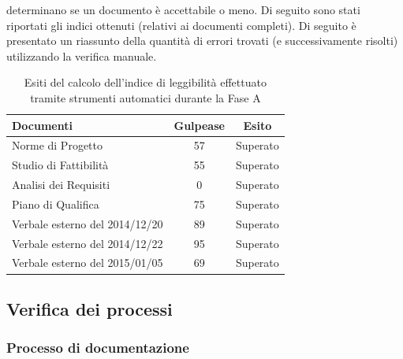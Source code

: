 				determinano se un documento è accettabile o meno. Di seguito sono stati riportati gli indici ottenuti (relativi ai documenti completi).
				Di seguito è presentato un riassunto della quantità di errori trovati (e successivamente risolti) utilizzando la verifica manuale.
				\begin{table}[H]
					\centering
					\begin{tabu}{| l | c | c |}
							\hline
							Documenti 				& Gulpease	& Esito  \\ \hline
							
							Norme di Progetto 				& 57		& Superato 		 \\ \hline
							Studio di Fattibilità 				& 55		& Superato 		 \\ \hline
							Analisi dei Requisiti	 			& 0		& Superato 		 \\ \hline
							Piano di Qualifica 				& 75		& Superato 	 \\ \hline
							Verbale esterno del 2014/12/20 	& 89 		& Superato	\\ \hline
							Verbale esterno del 2014/12/22	 	& 95		& Superato 	\\  \hline
							Verbale esterno del 2015/01/05		& 69		& Superato\\ \hline 
						\end{tabu}
					\caption{Esiti del calcolo dell'indice di leggibilità effettuato tramite strumenti automatici durante la Fase A}
				\end{table}
	\subsection{Verifica dei processi}
		\subsubsection{Processo di documentazione}
